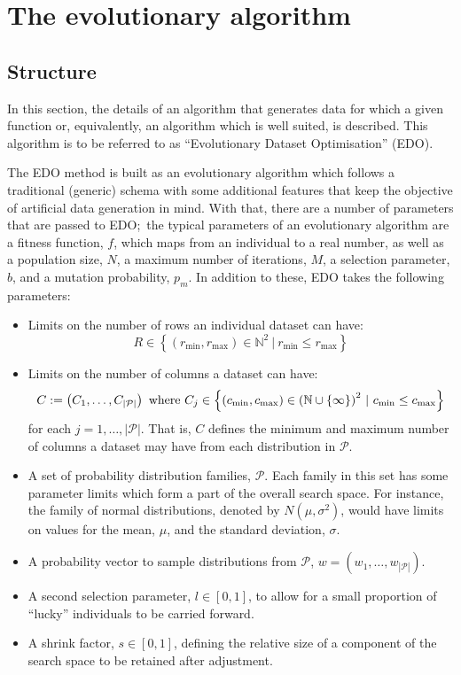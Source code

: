 \section{The evolutionary algorithm}\label{section:algorithm}

\subsection{Structure}

In this section, the details of an algorithm that generates data for which a
given function or, equivalently, an algorithm which is well suited, is
described. This algorithm is to be referred to as ``Evolutionary Dataset
Optimisation'' (EDO).

The EDO method is built as an evolutionary algorithm which follows a traditional
(generic) schema with some additional features that keep the objective of
artificial data generation in mind. With that, there are a number of parameters
that are passed to EDO;\ the typical parameters of an evolutionary algorithm
are a fitness function, \(f\), which maps from an individual to a real number,
as well as a population size, \(N\), a maximum number of iterations, \(M\), a
selection parameter, \(b\), and a  mutation probability, \(p_m\). In addition to
these, EDO takes the following parameters:

\begin{itemize}
    \item Limits on the number of rows an individual dataset can have:
        \[
            R \in \left\{%
                (r_{\min}, r_{\max}) \in \mathbb{N}^2~|~r_{\min} \leq r_{\max}
            \right\}
        \]
    \item Limits on the number of columns a dataset can have:
        \[
            C := \left(C_1, \ldots, C_{|\mathcal{P}|}\right)
            ~\text{where}~
            C_j \in \left\{ (c_{\min}, c_{\max}) \in {%
                \left(\mathbb{N}\cup\{\infty\}\right)
            }^2~|~c_{\min} \leq c_{\max}\right\}
        \]
        for each \(j = 1, \ldots, |\mathcal{P}|\). That is, \(C\) defines the
        minimum and maximum number of columns a dataset may have from each
        distribution in \(\mathcal{P}\).
    \item A set of probability distribution families, \(\mathcal{P}\). Each
        family in this set has some parameter limits which form a part of the
        overall search space. For instance, the family of normal distributions,
        denoted by \(N(\mu, \sigma^2)\), would have limits on values for the
        mean, \(\mu\), and the standard deviation, \(\sigma\).
    \item A probability vector to sample distributions from \(\mathcal{P}\),
        \(w = \left(w_1, \ldots, w_{|\mathcal{P}|}\right)\).
    \item A second selection parameter, \(l \in [0, 1]\), to allow for a
        small proportion of ``lucky'' individuals to be carried forward.
    \item A shrink factor, \(s \in [0, 1]\), defining the relative size of a
        component of the search space to be retained after adjustment.
\end{itemize}

